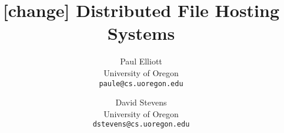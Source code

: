 \documentclass[10pt]{article}
\date{}
\begin{document}
\setcounter{page}{1}
\pagestyle{plain}


\title{[change] Distributed File Hosting Systems} 
\author{
{Paul Elliott}\\
University of Oregon\\
\texttt{paule@cs.uoregon.edu}
\and
{David Stevens}\\
University of Oregon\\
\texttt{dstevens@cs.uoregon.edu}
}

\maketitle



\end{document}
